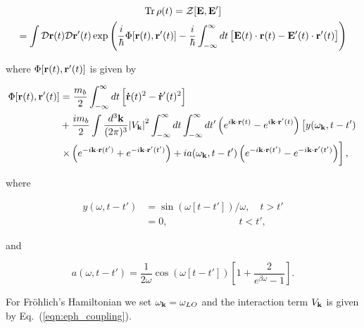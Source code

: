 \begin{equation}
    \begin{gathered}
    \Tr \rho(t) = \mathcal{Z}[\vb{E}, \vb{E'}] \\ = \int \mathcal{D}\vb{r}(t) \mathcal{D}\vb{r'}(t) \exp\left( \frac{i}{\hbar} \Phi[\vb{r}(t), \vb{r'}(t)] - \frac{i}{\hbar} \int^{\infty}_{-\infty} dt \left[ \vb{E}(t) \cdot \vb{r}(t) - \vb{E'}(t) \cdot \vb{r'}(t) \right] \right)
    \end{gathered}
\end{equation}

where $ \Phi[\vb{r}(t), \vb{r'}(t)]$ is given by

\begin{equation}\label{eqn:fhip_model_term}
    \begin{aligned}
    \Phi[\vb{r}(t), \vb{r'}(t)] &= \frac{m_b}{2} \int^{\infty}_{-\infty} dt  \left[ \vb{\dot{r}}(t)^2 - \vb{\dot{r}'}(t)^2 \right] \\
    &+ \frac{im_b}{2} \int \frac{d^3\vb{k}}{(2\pi)^3} \abs{V_{\vb{k}}}^2 \int^{\infty}_{-\infty} dt \int^{\infty}_{-\infty} dt'  \left(e^{i\vb{k}\cdot \vb{r}(t)} -  e^{i\vb{k}\cdot \vb{r'}(t)}\right)\left[ y(\omega_{\vb{k}}, t - t') \right. \\
    &\left. \times \left( e^{-i\vb{k}\cdot \vb{r}(t')} + e^{-i\vb{k}\cdot \vb{r'}(t')}\right) + ia(\omega_{\vb{k}}, t - t') \left( e^{-i\vb{k}\cdot \vb{r}(t')} - e^{-i\vb{k}\cdot \vb{r'}(t')}\right) \right],
    \end{aligned}
\end{equation}

where

\begin{equation}
    \begin{aligned}
        y(\omega, t - t') &= \sin(\omega [t - t']) / \omega, \quad t > t' \\
        &= 0, \qquad\qquad\qquad\quad\ t < t',
    \end{aligned}
\end{equation}

and 

\begin{equation}
    a(\omega, t - t') = \frac{1}{2\omega} \cos(\omega[t-t']) \left[1 + \frac{2}{e^{\beta \omega} - 1}\right].
\end{equation}

For Fr\"ohlich's Hamiltonian we set $\omega_{\vb{k}} = \omega_{LO}$ and the interaction term $V_{\vb{k}}$ is given by Eq.~(\ref{eqn:eph_coupling}). 

